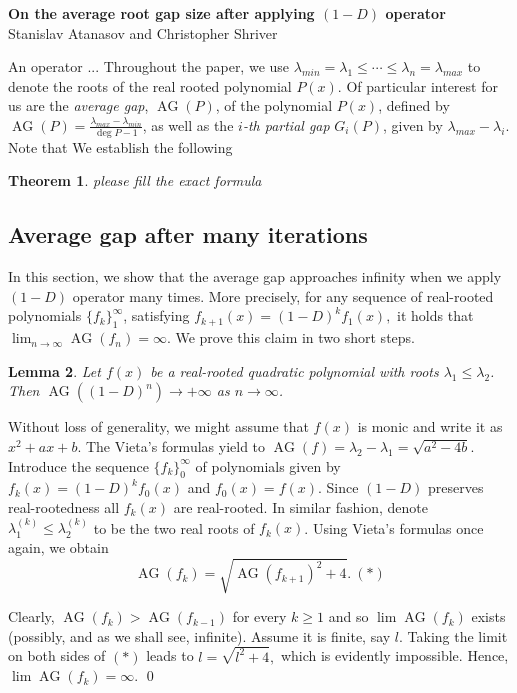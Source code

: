 \documentclass[11pt]{article}
\DeclareMathOperator{\AG}{AG}
\newtheorem{theorem}{Theorem}[section]
\newtheorem{lemma}[theorem]{Lemma}
\begin{document}
\begin{center}
\textbf{On the average root gap size after applying $(1-D)$ operator}\\
Stanislav Atanasov and Christopher Shriver
\end{center}

An operator ...
Throughout the paper, we use $\lambda_{min}=\lambda_1\leq \cdots \leq \lambda_n = \lambda_{max}$ to denote the roots of the real rooted polynomial $P(x)$. Of particular interest for us are the \emph{average gap}, $\AG(P)$, of the polynomial $P(x)$, defined by $\AG(P)=\frac{\lambda_{max} - \lambda_{min}}{\deg P - 1}$, as well as the \emph{$i$-th partial gap} $G_i(P)$, given by $\lambda_{max}-\lambda_i$. Note that  We establish the following

\begin{theorem}
please fill the exact formula
\end{theorem}

\subsection{Average gap after many iterations}
 In this section, we show that the average gap approaches infinity when we apply $(1-D)$ operator many times. More precisely, for any sequence of real-rooted polynomials $\{f_k\}_1^{\infty}$, satisfying $f_{k+1}(x) = (1-D)^k f_{1}(x),$ it holds that $\lim_{n\to \infty} \AG(f_n) = \infty$. We prove this claim in two short steps.
 
 \begin{lemma}
 \label{degree two avg distance}
 Let $f(x)$ be a real-rooted quadratic polynomial with roots $\lambda_1 \leq \lambda_2$. Then $\AG((1-D)^n) \to +\infty$ as ${n\to \infty}$.
 \end{lemma}
\proof 
Without loss of generality, we might assume that $f(x)$ is monic and write it as $x^2+ax+b$. The Vieta's formulas yield to $\AG(f) = \lambda_2 - \lambda_1 = \sqrt{a^2 - 4b}$. Introduce the sequence $\{f_k\}_{0}^\infty$ of polynomials given by $f_{k} (x)= (1-D)^k f_0(x)$ and $f_0(x) = f(x)$. Since $(1-D)$ preserves real-rootedness all $f_k(x)$ are real-rooted. In similar fashion, denote $\lambda_1^{(k)} \leq \lambda_2^{(k)}$ to be the two real roots of $f_k(x)$. Using Vieta's formulas once again, we obtain
 \[\AG(f_k) = \sqrt{\AG(f_{k+1})^2 + 4}.~(*)\] 
 
 Clearly, $\AG(f_k) > \AG(f_{k-1})$ for every $k\ge 1$ and so  $\lim \AG(f_k)$ exists (possibly, and as we shall see, infinite). Assume it is finite, say $l$. Taking the limit on both sides of $(*)$ leads to $l = \sqrt{l^2 + 4},$ which is evidently impossible. Hence, $\lim \AG(f_k) = \infty$. \qed
\end{document}
